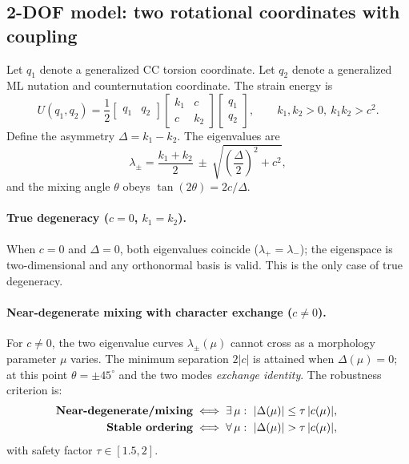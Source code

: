 \documentclass[11pt]{article}
\begin{document}
\subsection{2-DOF model: two rotational coordinates with coupling}
\label{sec:2dof}
Let $q_1$ denote a generalized CC torsion coordinate. Let $q_2$ denote a generalized ML nutation and counternutation coordinate. The strain energy is
\begin{equation}
U(q_1,q_2)=\frac12
\begin{bmatrix}q_1 & q_2\end{bmatrix}
\begin{bmatrix}k_1 & c\\[2pt] c & k_2\end{bmatrix}
\begin{bmatrix}q_1\\[2pt]q_2\end{bmatrix},
\qquad k_1,k_2>0,\ k_1k_2>c^2.
\end{equation}
Define the asymmetry $\Delta=k_1-k_2$. The eigenvalues are
\begin{equation}
\lambda_{\pm}=\frac{k_1+k_2}{2}\ \pm\ \sqrt{\left(\frac{\Delta}{2}\right)^2+c^2},
\end{equation}
and the mixing angle $\theta$ obeys $\tan(2\theta)={2c}/{\Delta}$.

\paragraph{True degeneracy ($c=0$, $k_1=k_2$).}
When $c=0$ and $\Delta=0$, both eigenvalues coincide ($\lambda_+=\lambda_-$); the eigenspace is two-dimensional and any orthonormal basis is valid. This is the only case of true degeneracy.

\paragraph{Near-degenerate mixing with character exchange ($c\neq 0$).}
For $c\neq 0$, the two eigenvalue curves $\lambda_\pm(\mu)$ cannot cross as a morphology parameter $\mu$ varies.
The minimum separation $2|c|$ is attained when $\Delta(\mu)=0$; at this point $\theta=\pm 45^\circ$ and the two modes \emph{exchange identity}.
The robustness criterion is:
\begin{align}
\label{eq:criterion}
\text{\bf Near-degenerate/mixing} & \iff \exists\,\mu:\ |\Delta(\mu)|\le \tau\,|c(\mu)|,\qquad \\
\text{\bf Stable ordering} & \iff \forall\,\mu:\ |\Delta(\mu)|> \tau\,|c(\mu)|, \notag
\end{align}
with safety factor $\tau\in[1.5,2]$.
\end{document}
